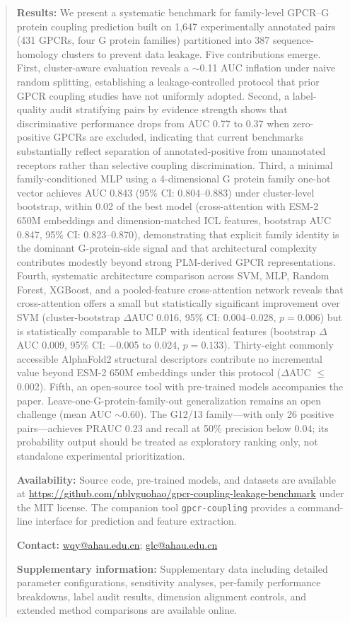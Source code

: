 \documentclass[11pt,a4paper]{article}
\begin{document}
\begin{abstract}
\textbf{Results:} We present a systematic benchmark for family-level GPCR--G protein coupling prediction built on 1,647 experimentally annotated pairs (431 GPCRs, four G protein families) partitioned into 387 sequence-homology clusters to prevent data leakage. Five contributions emerge. First, cluster-aware evaluation reveals a $\sim$0.11 AUC inflation under naive random splitting, establishing a leakage-controlled protocol that prior GPCR coupling studies have not uniformly adopted. Second, a label-quality audit stratifying pairs by evidence strength shows that discriminative performance drops from AUC 0.77 to 0.37 when zero-positive GPCRs are excluded, indicating that current benchmarks substantially reflect separation of annotated-positive from unannotated receptors rather than selective coupling discrimination. Third, a minimal family-conditioned MLP using a 4-dimensional G protein family one-hot vector achieves AUC 0.843 (95\% CI: 0.804--0.883) under cluster-level bootstrap, within 0.02 of the best model (cross-attention with ESM-2 650M embeddings and dimension-matched ICL features, bootstrap AUC 0.847, 95\% CI: 0.823--0.870), demonstrating that explicit family identity is the dominant G-protein-side signal and that architectural complexity contributes modestly beyond strong PLM-derived GPCR representations. Fourth, systematic architecture comparison across SVM, MLP, Random Forest, XGBoost, and a pooled-feature cross-attention network reveals that cross-attention offers a small but statistically significant improvement over SVM (cluster-bootstrap $\Delta$AUC 0.016, 95\% CI: 0.004--0.028, $p = 0.006$) but is statistically comparable to MLP with identical features (bootstrap $\Delta$AUC 0.009, 95\% CI: $-$0.005 to 0.024, $p = 0.133$). Thirty-eight commonly accessible AlphaFold2 structural descriptors contribute no incremental value beyond ESM-2 650M embeddings under this protocol ($\Delta$AUC $\le$ 0.002). Fifth, an open-source tool with pre-trained models accompanies the paper. Leave-one-G-protein-family-out generalization remains an open challenge (mean AUC $\sim$0.60). The G12/13 family---with only 26 positive pairs---achieves PRAUC 0.23 and recall at 50\% precision below 0.04; its probability output should be treated as exploratory ranking only, not standalone experimental prioritization.

\textbf{Availability:} Source code, pre-trained models, and datasets are available at \url{https://github.com/nblvguohao/gpcr-coupling-leakage-benchmark} under the MIT license. The companion tool \texttt{gpcr-coupling} provides a command-line interface for prediction and feature extraction.

\textbf{Contact:} \href{mailto:wqy@ahau.edu.cn}{wqy@ahau.edu.cn}; \href{mailto:glc@ahau.edu.cn}{glc@ahau.edu.cn}

\textbf{Supplementary information:} Supplementary data including detailed parameter configurations, sensitivity analyses, per-family performance breakdowns, label audit results, dimension alignment controls, and extended method comparisons are available online.

\end{abstract}
\end{document}
